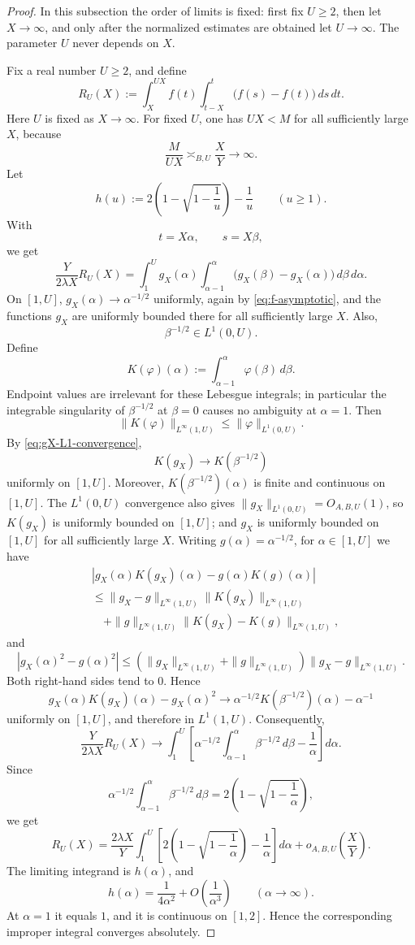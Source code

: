 \documentclass[11pt]{article}
\begin{document}
\begin{proof}
In this subsection the order of limits is fixed: first fix $U\ge2$, then let $X\to\infty$,
and only after the normalized estimates are obtained let $U\to\infty$. The parameter $U$ never
depends on $X$.

Fix a real number $U\ge2$, and define
\[
R_U(X)
:=
\int_X^{UX}
 f(t)\int_{t-X}^t\bigl(f(s)-f(t)\bigr)\,ds\,dt.
\]
Here $U$ is fixed as $X\to\infty$. For fixed $U$, one has $UX<M$ for all sufficiently large
$X$, because
\[
\frac{M}{UX}\asymp_{B,U}\frac{X}{Y}\to\infty.
\]
Let
\[
h(u):=2\left(1-\sqrt{1-\frac1u}\right)-\frac1u
\qquad(u\ge1).
\]
With
\[
t=X\alpha,
\qquad
s=X\beta,
\]
we get
\[
\frac{Y}{2\lambda X}R_U(X)
=
\int_1^U
 g_X(\alpha)\int_{\alpha-1}^{\alpha}
 \bigl(g_X(\beta)-g_X(\alpha)\bigr)\,d\beta\,d\alpha.
\]
On $[1,U]$, $g_X(\alpha)\to \alpha^{-1/2}$ uniformly, again by \eqref{eq:f-asymptotic}, and the
functions $g_X$ are uniformly bounded there for all sufficiently large $X$. Also,
\[
\beta^{-1/2}\in L^1(0,U).
\]
Define
\[
K(\varphi)(\alpha):=\int_{\alpha-1}^{\alpha} \varphi(\beta)\,d\beta.
\]
Endpoint values are irrelevant for these Lebesgue integrals; in particular the integrable
singularity of $\beta^{-1/2}$ at $\beta=0$ causes no ambiguity at $\alpha=1$.
Then
\[
\|K(\varphi)\|_{L^\infty(1,U)}
\le
\|\varphi\|_{L^1(0,U)}.
\]
By \eqref{eq:gX-L1-convergence},
\[
K(g_X)\to K(\beta^{-1/2})
\]
uniformly on $[1,U]$. Moreover, $K(\beta^{-1/2})(\alpha)$ is finite and continuous on $[1,U]$.
The $L^1(0,U)$ convergence also gives $\|g_X\|_{L^1(0,U)}=O_{A,B,U}(1)$, so $K(g_X)$ is uniformly
bounded on $[1,U]$; and $g_X$ is uniformly bounded on $[1,U]$ for all sufficiently large $X$.
Writing $g(\alpha)=\alpha^{-1/2}$, for $\alpha\in[1,U]$ we have
\[
\begin{aligned}
&|g_X(\alpha)K(g_X)(\alpha)-g(\alpha)K(g)(\alpha)|
\\
&\le
\|g_X-g\|_{L^\infty(1,U)}\|K(g_X)\|_{L^\infty(1,U)}
\\
&\quad+
\|g\|_{L^\infty(1,U)}\|K(g_X)-K(g)\|_{L^\infty(1,U)},
\end{aligned}
\]
and
\[
|g_X(\alpha)^2-g(\alpha)^2|
\le
(\|g_X\|_{L^\infty(1,U)}+\|g\|_{L^\infty(1,U)})
\|g_X-g\|_{L^\infty(1,U)}.
\]
Both right-hand sides tend to $0$. Hence
\[
g_X(\alpha)K(g_X)(\alpha)-g_X(\alpha)^2
\to
\alpha^{-1/2}K(\beta^{-1/2})(\alpha)-\alpha^{-1}
\]
uniformly on $[1,U]$, and therefore in $L^1(1,U)$. Consequently,
\[
\frac{Y}{2\lambda X}R_U(X)
\to
\int_1^U
\left[
 \alpha^{-1/2}\int_{\alpha-1}^{\alpha} \beta^{-1/2}\,d\beta
-
\frac1\alpha
\right]d\alpha.
\]
Since
\[
\alpha^{-1/2}\int_{\alpha-1}^{\alpha} \beta^{-1/2}\,d\beta
=
2\left(1-\sqrt{1-\frac1\alpha}\right),
\]
we get
\[
R_U(X)
=
\frac{2\lambda X}{Y}
\int_1^U
\left[
2\left(1-\sqrt{1-\frac1\alpha}\right)-\frac1\alpha
\right]d\alpha
+
o_{A,B,U}\left(\frac X Y\right).
\tag{31}\label{eq:RU-limit}
\]
The limiting integrand is $h(\alpha)$, and
\[
h(\alpha)
=
\frac1{4\alpha^2}+O\left(\frac1{\alpha^3}\right)
\qquad(\alpha\to\infty).
\]
At $\alpha=1$ it equals $1$, and it is continuous on $[1,2]$. Hence the corresponding improper
integral converges absolutely.


\end{proof}
\end{document}
